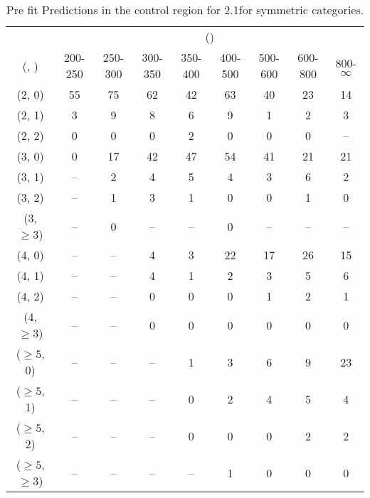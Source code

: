 \begin{table}[h!]
\tiny
\centering
\caption{Pre fit Predictions in the \mmj control region for 2.1\ifb for symmetric categories.\label{tab:predsepnaive_mumu_data_sym}}
\begin{tabular}
{ccccccccc}
	\hline\hline
	& \multicolumn{8}{c}{\scalht (\gev)} \\ 
	 (\njet,  \nb) & 200-250 & 250-300 & 300-350 & 350-400 & 400-500 & 500-600 & 600-800 & 800-$\infty$ \\ [0.8ex] 
\hline
	(2, 0) & 55 & 75 & 62 & 42 & 63 & 40 & 23 & 14 \\[0.5ex] 
	(2, 1) & 3 & 9 & 8 & 6 & 9 & 1 & 2 & 3 \\[0.5ex] 
	(2, 2) & 0 & 0 & 0 & 2 & 0 & 0 & 0 & -- \\[0.5ex] 
	(3, 0) & 0 & 17 & 42 & 47 & 54 & 41 & 21 & 21 \\[0.5ex] 
	(3, 1) & -- & 2 & 4 & 5 & 4 & 3 & 6 & 2 \\[0.5ex] 
	(3, 2) & -- & 1 & 3 & 1 & 0 & 0 & 1 & 0 \\[0.5ex] 
	(3, $\ge3$) & -- & 0 & -- & -- & 0 & -- & -- & -- \\[0.5ex] 
	(4, 0) & -- & -- & 4 & 3 & 22 & 17 & 26 & 15 \\[0.5ex] 
	(4, 1) & -- & -- & 4 & 1 & 2 & 3 & 5 & 6 \\[0.5ex] 
	(4, 2) & -- & -- & 0 & 0 & 0 & 1 & 2 & 1 \\[0.5ex] 
	(4, $\ge3$) & -- & -- & 0 & 0 & 0 & 0 & 0 & 0 \\[0.5ex] 
	($\ge5$, 0) & -- & -- & -- & 1 & 3 & 6 & 9 & 23 \\[0.5ex] 
	($\ge5$, 1) & -- & -- & -- & 0 & 2 & 4 & 5 & 4 \\[0.5ex] 
	($\ge5$, 2) & -- & -- & -- & 0 & 0 & 0 & 2 & 2 \\[0.5ex] 
	($\ge5$, $\ge3$) & -- & -- & -- & -- & 1 & 0 & 0 & 0 \\[0.5ex] 
	\hline
	\hline
\end{tabular}
\end{table}
